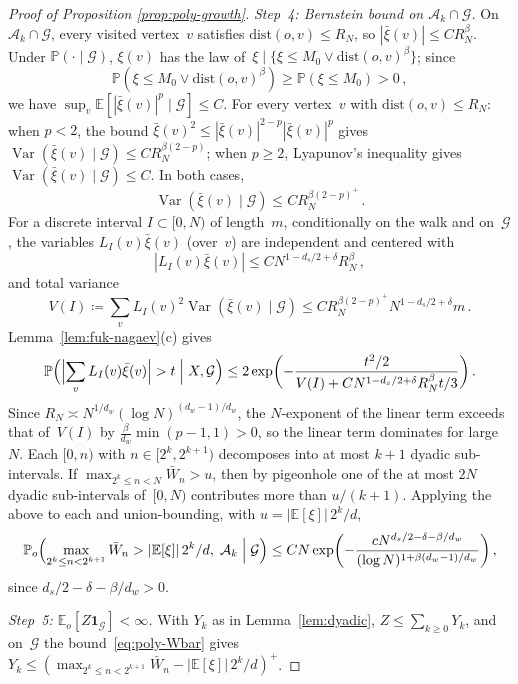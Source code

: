 \documentclass[aop]{imsart}
\theoremstyle{plain}
\theoremstyle{definition}
\newcommand{\E}{\mathbb{E}}
\renewcommand{\P}{\mathbb{P}}
\newcommand{\one}{\mathbf{1}}
\DeclareMathOperator{\var}{Var}
\begin{document}
\begin{proof}[Proof of Proposition \ref{prop:poly-growth}]
		\emph{Step~4: Bernstein bound on $\mathcal{A}_k\cap\mathcal{G}$.}
		On $\mathcal{A}_k\cap\mathcal{G}$, every visited vertex~$v$ satisfies $\mathrm{dist}(o,v)\leq R_N$, so $|\bar\xi(v)| \leq CR_N^{\beta}$.
		Under $\P(\cdot\mid\mathcal{G})$, $\xi(v)$ has the law of~$\xi\mid\{\xi\leq M_0\vee \mathrm{dist}(o,v)^\beta\}$; since
		\[
		\P(\xi\leq M_0\vee \mathrm{dist}(o,v)^\beta)\geq\P(\xi\leq M_0)>0\,,
		\]
		we have $\sup_v\E[|\bar\xi(v)|^p\mid\mathcal{G}]\leq C$. For every vertex~$v$ with $\mathrm{dist}(o,v)\leq R_N$: when $p<2$, the bound $\bar\xi(v)^2\leq |\bar\xi(v)|^{2-p}|\bar\xi(v)|^p$ gives $\var(\bar\xi(v)\mid\mathcal{G})\leq CR_N^{\beta(2-p)}$; when $p\geq 2$, Lyapunov's inequality gives $\var(\bar\xi(v)\mid\mathcal{G})\leq C$. In both cases,
		\[
		\var(\bar\xi(v)\mid\mathcal{G})\leq CR_N^{\beta(2-p)^+}\,.
		\]
		For a discrete interval $I\subset[0,N)$ of length~$m$, conditionally on the walk and on~$\mathcal{G}$, the variables $L_I(v)\bar\xi(v)$ (over~$v$) are independent and centered with
		\[
		|L_I(v)\bar\xi(v)| \leq CN^{1-d_s/2+\delta}R_N^{\beta}\,,
		\]
		and total variance
		\[
		V(I) \coloneqq \sum_v L_I(v)^2\var(\bar\xi(v)\mid\mathcal{G}) \leq CR_N^{\beta(2-p)^+} N^{1-d_s/2+\delta} m\,.
		\]
		Lemma~\ref{lem:fuk-nagaev}(c) gives
		\[
		\P\Bigl(\Bigl|\sum_v L_I(v)\bar\xi(v)\Bigr|>t\;\Big|\;X,\mathcal{G}\Bigr)
		\leq 2\exp\biggl(-\frac{t^2/2}{V(I) + C N^{1-d_s/2+\delta}R_N^{\beta} t/3}\biggr)\,.
		\]
		Since $R_N\asymp N^{1/d_w}(\log N)^{(d_w-1)/d_w}$, the $N$-exponent of the linear term exceeds that of~$V(I)$ by $\tfrac{\beta}{d_w}\min(p{-}1,1)>0$, so the linear term dominates for large~$N$.  Each $[0,n)$ with $n\in[2^k,2^{k+1})$ decomposes into at most $k{+}1$ dyadic sub-intervals.  If $\max_{2^k\leq n<N}\bar W_n>u$, then by pigeonhole one of the at most $2N$ dyadic sub-intervals of~$[0,N)$ contributes more than $u/(k{+}1)$.  Applying the above to each and union-bounding, with $u=|\E[\xi]|\,2^k/d$,
		\begin{equation}\label{eq:poly-Bernstein}
			\P_o\Bigl(\max_{2^k\leq n<2^{k+1}}\bar W_n > |\E[\xi]|\,2^k/d,\;\mathcal{A}_k\;\Big|\;\mathcal{G}\Bigr)
			\leq CN\exp\biggl(-\frac{cN^{d_s/2-\delta-\beta/d_w}}{(\log N)^{1+\beta(d_w-1)/d_w}}\biggr)\,,
		\end{equation}
		since $d_s/2-\delta-\beta/d_w>0$.
		
		\emph{Step~5: $\E_o[Z\one_\mathcal{G}]<\infty$.}
		With $Y_k$ as in Lemma~\ref{lem:dyadic}, $Z\leq\sum_{k\geq 0}Y_k$, and on~$\mathcal{G}$ the bound~\eqref{eq:poly-Wbar} gives $Y_k\leq (\max_{2^k\leq n<2^{k+1}}\bar W_n-|\E[\xi]|\,2^k/d)^+$.
		

\end{proof}
\end{document}
